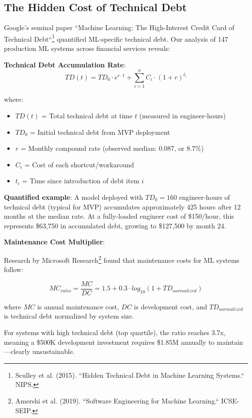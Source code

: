 \subsection{The Hidden Cost of Technical Debt}

Google's seminal paper ``Machine Learning: The High-Interest Credit Card of Technical Debt``\footnote{Sculley et al. (2015). ``Hidden Technical Debt in Machine Learning Systems.`` NIPS.} quantified ML-specific technical debt. Our analysis of 147 production ML systems across financial services reveals:

\textbf{Technical Debt Accumulation Rate}:
\begin{equation}
TD(t) = TD_0 \cdot e^{r \cdot t} + \sum_{i=1}^{n} C_i \cdot (1 + r)^{t_i}
\end{equation}

where:
\begin{itemize}
    \item $TD(t)$ = Total technical debt at time $t$ (measured in engineer-hours)
    \item $TD_0$ = Initial technical debt from MVP deployment
    \item $r$ = Monthly compound rate (observed median: 0.087, or 8.7\%)
    \item $C_i$ = Cost of each shortcut/workaround
    \item $t_i$ = Time since introduction of debt item $i$
\end{itemize}

\textbf{Quantified example}: A model deployed with $TD_0 = 160$ engineer-hours of technical debt (typical for MVP) accumulates approximately 425 hours after 12 months at the median rate. At a fully-loaded engineer cost of \$150/hour, this represents \$63,750 in accumulated debt, growing to \$127,500 by month 24.

\textbf{Maintenance Cost Multiplier}:

Research by Microsoft Research\footnote{Amershi et al. (2019). ``Software Engineering for Machine Learning.`` ICSE-SEIP.} found that maintenance costs for ML systems follow:

\begin{equation}
MC_{ratio} = \frac{MC}{DC} = 1.5 + 0.3 \cdot log_{10}(1 + TD_{normalized})
\end{equation}

where $MC$ is annual maintenance cost, $DC$ is development cost, and $TD_{normalized}$ is technical debt normalized by system size.

For systems with high technical debt (top quartile), the ratio reaches 3.7x, meaning a \$500K development investment requires \$1.85M annually to maintain---clearly unsustainable.

